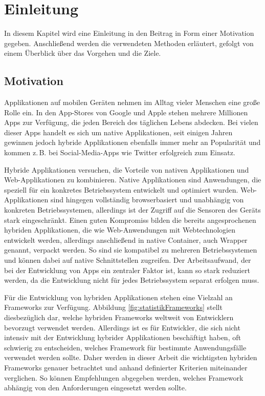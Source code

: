 \documentclass[]{lni}
\begin{document}
\section{Einleitung}
In diesem Kapitel wird eine Einleitung in den Beitrag in Form einer Motivation gegeben. Anschließend werden die verwendeten Methoden erläutert, gefolgt von einem Überblick über das Vorgehen und die Ziele.

\subsection{Motivation}

Applikationen auf mobilen Geräten nehmen im Alltag vieler Menschen eine große Rolle ein. In den App-Stores von Google und Apple stehen mehrere Millionen Apps zur Verfügung, die jeden Bereich des täglichen Lebens abdecken. Bei vielen dieser Apps handelt es sich um native Applikationen, seit einigen Jahren gewinnen jedoch hybride Applikationen ebenfalls immer mehr an Popularität und kommen z.\,B. bei Social-Media-Apps wie Twitter erfolgreich zum Einsatz.

Hybride Applikationen versuchen, die Vorteile von nativen Applikationen und Web-Applikationen zu kombinieren. Native Applikationen sind Anwendungen, die speziell für ein konkretes Betriebssystem entwickelt und optimiert wurden. Web-Applikationen sind hingegen vollständig browserbasiert und unabhängig von konkreten Betriebssystemen, allerdings ist der Zugriff auf die Sensoren des Geräts stark eingeschränkt. Einen guten Kompromiss bilden die bereits angesprochenen hybriden Applikationen, die wie Web-Anwendungen mit Webtechnologien entwickelt werden, allerdings anschließend in native Container, auch Wrapper genannt, verpackt werden. So sind sie kompatibel zu mehreren Betriebssystemen und können dabei auf native Schnittstellen zugreifen. Der Arbeitsaufwand, der bei der Entwicklung von Apps ein zentraler Faktor ist, kann so stark reduziert werden, da die Entwicklung nicht für jedes Betriebssystem separat erfolgen muss. 

Für die Entwicklung von hybriden Applikationen stehen eine Vielzahl an Frameworks zur Verfügung. Abbildung \ref{fig:statistikFrameworks} stellt diesbezüglich dar, welche hybriden Frameworks weltweit von Entwicklern bevorzugt verwendet werden. Allerdings ist es für Entwickler, die sich nicht intensiv mit der Entwicklung hybrider Applikationen beschäftigt haben, oft schwierig zu entscheiden, welches Framework für bestimmte Anwendungsfälle verwendet werden sollte. Daher werden in dieser Arbeit die wichtigsten hybriden Frameworks genauer betrachtet und anhand definierter Kriterien miteinander verglichen. So können Empfehlungen abgegeben werden, welches Framework abhängig von den Anforderungen eingesetzt werden sollte. \\
\end{document}
